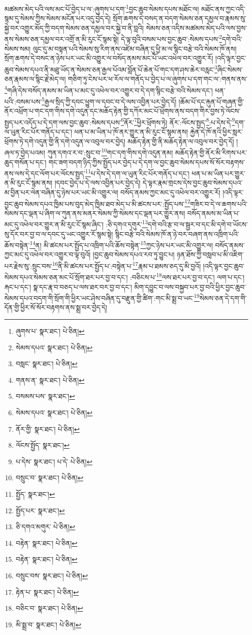 མཚམས་མེད་པའི་ལས་མང་པོ་བྱེད་པ་ལ་:ཞུགས་པ་དག་\footnote{ཞུགས་པ་  སྣར་ཐང་།  པེ་ཅིན། }བྱང་ཆུབ་སེམས་དཔས་མཐོང་ལ། མཐོང་ནས་ཀྱང་འདི་སྙམ་དུ་སེམས་ཀྱིས་སེམས་མངོན་པར་འདུ་བྱེད་དེ། སྲོག་ཆགས་དེ་བསད་ན་བདག་སེམས་ཅན་དམྱལ་བ་རྣམས་སུ་སྐྱེ་བར་འགྱུར་མོད་ཀྱི་བདག་སེམས་ཅན་དམྱལ་བར་སྐྱེ་བ་ནི་བླའི། སེམས་ཅན་འདིས་མཚམས་མེད་པའི་ལས་བྱས་ནས་སེམས་ཅན་དམྱལ་བར་འགྲོ་ན་མི་རུང་ངོ་སྙམ་སྟེ། དེ་ལྟ་བུའི་བསམ་པས་བྱང་ཆུབ་:སེམས་དཔས་\footnote{སེམས་དཔའ་  སྣར་ཐང་།  པེ་ཅིན། }དགེ་བའི་སེམས་སམ། ལུང་དུ་མ་བསྟན་པའི་སེམས་སུ་རིག་ནས་འཛེམ་བཞིན་དུ་ཕྱི་མ་ལ་སྙིང་བརྩེ་བའི་སེམས་ཁོ་ནས། སྲོག་ཆགས་དེ་བསང་ན་ཉེས་པར་ཡང་མི་འགྱུར་ལ་བསོད་ནམས་མང་པོ་ཡང་འཕེལ་བར་འགྱུར་རོ། །འདི་ལྟར་བྱང་ཆུབ་སེམས་དཔའ་ནི་མཐུ་ཡོད་ན་སེམས་ཅན་རྒྱལ་པོའམ་བློན་པོ་ཆེན་པོ་གང་དག་ཤས་ཆེར་བརླང་\footnote{བསླང་  སྣར་ཐང་།  པེ་ཅིན། }ཞིང་སེམས་ཅན་རྣམས་ལ་སྙིང་རྗེ་མེད་ལ། གཅིག་ཏུ་ངེས་པར་ཕ་རོལ་ལ་གནོད་པ་བྱེད་པ་ལ་ཞུགས་པ་དག་གང་ལ་:གནས་ནས་\footnote{གནས་ན་  སྣར་ཐང་།  པེ་ཅིན། }གཞི་དེས་བསོད་ནམས་མ་ཡིན་པ་མང་དུ་འཕེལ་བར་འགྱུར་བ་དེ་དག་སྙིང་བརྩེ་བའི་སེམས་དང་། ཕན་པའི་:བསམ་པས་\footnote{བསམས་པས་  སྣར་ཐང་། }རྒྱལ་སྲིད་ཀྱི་དབང་ཕྱུག་ལ་དབང་བ་དེ་ལས་འབྱིན་པར་བྱེད་དོ། །ཆོམ་པོ་དང་རྐུན་པོ་གཞན་གྱི་ནོར་འཕྲོག་པ་གང་དག་གིས་དགེ་འདུན་དང་མཆོད་རྟེན་གྱི་དཀོར་མང་པོ་ཕྲོགས་ནས་བདག་གིར་བྱས་ཏེ་ལོངས་སྤྱད་པར་འདོད་པ་དེ་དག་ལས་བྱང་ཆུབ་:སེམས་དཔས་\footnote{སེམས་དཔའ་  སྣར་ཐང་།  པེ་ཅིན། }ནོར་\footnote{ནོར་གྱི་  སྣར་ཐང་།  པེ་ཅིན། }ཕྱིར་ཕྲོགས་ཏེ། ནོར་:ལོངས་སྤྱད་\footnote{ལོངས་སྤྱོད་  སྣར་ཐང་། }:པ་དེས་དེ་\footnote{པ་དེས་  སྣར་ཐང་། པ་དེ་  པེ་ཅིན། }དག་ལ་ཡུན་རིང་པོར་གནོད་པ་དང་། ཕན་པ་མ་ཡིན་པ་ཁོ་ནར་གྱུར་ན་མི་རུང་ངོ་སྙམ་ནས། རྐྱེན་དེ་ཁོ་ནའི་ཕྱིར་སླར་ཕྲོགས་ཏེ་དགེ་འདུན་གྱི་ནི་དགེ་འདུན་ལ་འབུལ་བར་བྱེད། མཆོད་རྟེན་གྱི་ནི་མཆོད་རྟེན་ལ་འབུལ་བར་བྱེད་དོ། །ཞལ་ཏ་བྱེད་པའམ། ཀུན་དགའ་ར་བ་:སྲུང་བ་\footnote{བསྲུང་བ་  སྣར་ཐང་།  པེ་ཅིན། }གང་དག་གིས་དགེ་འདུན་ནམ། མཆོད་རྟེན་གྱི་ནོར་མི་རིགས་པར་ཆུད་གསོན་པ་དང་། གང་ཟག་བདག་ཉིད་ཀྱིས་སྤྱོད་པར་བྱེད་པ་དེ་དག་ལ་བྱང་ཆུབ་སེམས་དཔས་སོ་སོར་བརྟགས་ནས་ལས་དེ་དང་ལོག་པར་ལོངས་སྤྱད་\footnote{སྤྱོད་  སྣར་ཐང་། }པ་དེས་དེ་དག་ལ་ཡུན་རིང་པོར་གནོད་པ་དང་། ཕན་པ་མ་ཡིན་པར་གྱུར་ན་མི་རུང་ངོ་སྙམ་ནས། །དབང་བྱེད་པ་དེ་ལས་འབྱིན་པར་བྱེད་དེ། དེ་ལྟར་རྣམ་གྲངས་དེས་བྱང་ཆུབ་སེམས་དཔའ་མ་བྱིན་པར་ལེན་བཞིན་དུ་ཉེས་པར་ཡང་མི་འགྱུར་ལ། བསོད་ནམས་ཀྱང་མང་དུ་འཕེལ་བར་འགྱུར་རོ། །འདི་ལྟར་བྱང་ཆུབ་སེམས་དཔའ་ཁྱིམ་པས་བུད་མེད་ཁྱིམ་ཐབ་མེད་པ་མི་ཚངས་པར་:སྤྱོད་པས་\footnote{སྤྱོད་པར་  སྣར་ཐང་། }གཟིར་བ་དེ་ལ་ཆགས་པའི་སེམས་དང་ལྡན་པ་ཞིག་ལ་ཀུན་ནས་མནར་སེམས་ཀྱི་སེམས་དང་ལྡན་པར་གྱུར་ནས། བསོད་ནམས་མ་ཡིན་པ་མང་དུ་འཕེལ་བར་གྱུར་ན་མི་རུང་ངོ་སྙམ་ཞིང་། :ཅི་དགའ་དགུར་\footnote{ཅི་དགའ་མགུར་  པེ་ཅིན། }དགེ་བའི་རྩ་བ་ལ་སྦྱར་བ་དང་མི་དགེ་བ་ཡོངས་སུ་དོར་བར་བྱ་བ་ལ་དབང་དུ་ཡང་འགྱུར་རོ་སྙམ་སྟེ། སྙིང་བརྩེ་བའི་སེམས་ཁོ་ན་ཉེ་བར་བཞག་ནས་འཁྲིག་པའི་ཆོས་བསྟེན་\footnote{བརྟེན་  སྣར་ཐང་།  པེ་ཅིན། }ན། མི་ཚངས་པར་སྤྱོད་པ་འཁྲིག་པའི་ཆོས་བསྟེན་\footnote{བརྟེན་  སྣར་ཐང་།  པེ་ཅིན། }ཀྱང་ཉེས་པར་ཡང་མི་འགྱུར་ལ། བསོད་ནམས་ཀྱང་མང་དུ་འཕེལ་བར་འགྱུར་བ་ལྟ་བུའོ། །བྱང་ཆུབ་སེམས་དཔའ་རབ་ཏུ་བྱུང་པ། ཉན་ཐོས་ཀྱི་བསླབ་པ་མི་འཇིག་པར་རྗེས་སུ་:སྲུང་བས་\footnote{བསྲུང་བས་  སྣར་ཐང་།  པེ་ཅིན། }ནི་མི་ཚངས་པར་སྤྱོད་པ་:བསྟེན་པ་\footnote{རྟེན་པ་  སྣར་ཐང་།  པེ་ཅིན། }རྣམ་པ་ཐམས་ཅད་དུ་མི་བྱའོ། །འདི་ལྟར་བྱང་ཆུབ་སེམས་དཔའ་སེམས་ཅན་མང་པོ་སྲོག་ཐར་པར་བྱ་བ་དང་། :བཅིངས་པ་\footnote{བཅིང་བ་  སྣར་ཐང་།  པེ་ཅིན། }ལས་ཐར་པར་བྱ་བ་དང་། ལག་པ་དང་། རྐང་པ་དང་། སྣ་དང་རྣ་བ་བཅད་པ་ལས་ཐར་བར་བྱ་བ་དང་། མིག་དབྱུང་བ་ལས་བསྐྱབ་པར་བྱ་བའི་ཕྱིར་བྱང་ཆུབ་སེམས་དཔའ་བདག་གི་སྲོག་གི་ཕྱིར་ཡང་ཤེས་བཞིན་དུ་བརྫུན་གྱི་ཚིག་:གང་མི་སྨྲ་བ་ཡང་\footnote{མི་སྨྲ་བ་  སྣར་ཐང་།  པེ་ཅིན། }སེམས་ཅན་དེ་དག་གི་དོན་གྱི་ཕྱིར་སོ་སོར་བརྟགས་ནས་སྨྲ་བར་བྱེད་དེ། 
